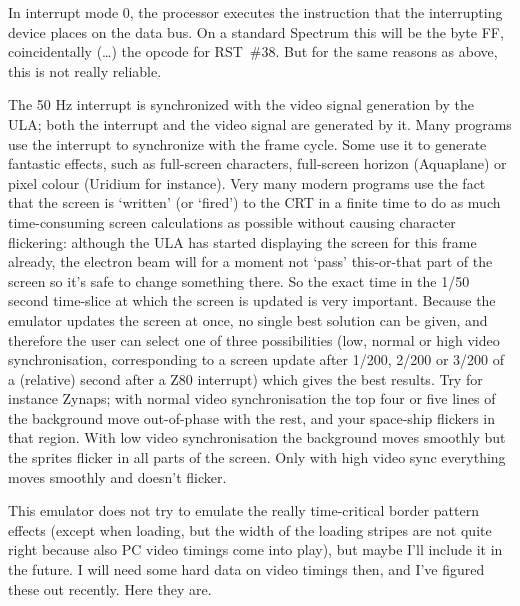     In interrupt mode 0, the processor executes the instruction that the
    interrupting device places on the data bus.  On a standard Spectrum this
    will be the byte FF, coincidentally (\ldots) the opcode for RST~\#38. But
    for the same reasons as above, this is not really reliable.

    The 50 Hz interrupt is synchronized with the video signal generation by
    the ULA; both the interrupt and the video signal are generated by it.
    Many programs use the interrupt to synchronize with the frame cycle.
    Some use it to generate fantastic effects, such as full-screen
    characters, full-screen horizon (Aquaplane) or pixel colour (Uridium for
    instance).  Very many modern programs use the fact that the screen is
    `written' (or `fired') to the CRT in a finite time to do as much
    time-consuming screen calculations as possible without causing character
    flickering:  although the ULA has started displaying the screen for this
    frame already, the electron beam will for a moment not `pass'
    this-or-that part of the screen so it's safe to change something there.
    So the exact time in the 1/50 second time-slice at which the screen is
    updated is very important.  Because the emulator updates the screen at
    once, no single best solution can be given, and therefore the user can
    select one of three possibilities (low, normal or high video
    synchronisation, corresponding to a screen update after 1/200, 2/200 or
    3/200 of a (relative) second after a Z80 interrupt) which gives the best
    results.  Try for instance Zynaps; with normal video synchronisation the
    top four or five lines of the background move out-of-phase with the
    rest, and your space-ship flickers in that region.  With low video
    synchronisation the background moves smoothly but the sprites flicker in
    all parts of the screen.  Only with high video sync everything moves
    smoothly and doesn't flicker.

    This emulator does not try to emulate the really time-critical border
    pattern effects (except when loading, but the width of the loading
    stripes are not quite right because also PC video timings come into
    play), but maybe I'll include it in the future.  I will need some hard
    data on video timings then, and I've figured these out recently.  Here
    they are.

